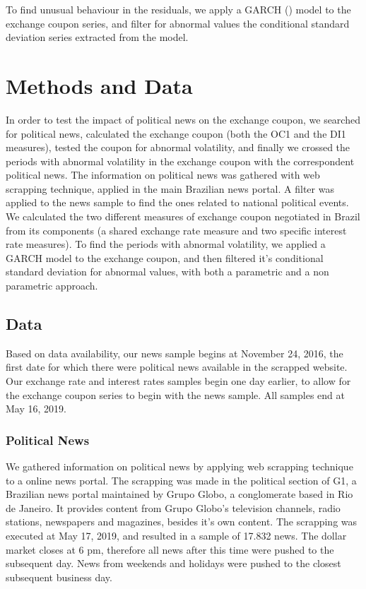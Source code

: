 \documentclass[cic,tc, english]{iiufrgs}
\begin{document}
    To find unusual behaviour in the residuals, we apply a GARCH (\citet{bollerslev1986}) model to the exchange coupon series, and filter for abnormal values the conditional standard deviation series extracted from the model.
    

\chapter{Methods and Data} \label{chapter_methods_data}

    In order to test the impact of political news on the exchange coupon, we searched for political news, calculated the exchange coupon (both the OC1 and the DI1 measures), tested the coupon for abnormal volatility, and finally we crossed the periods with abnormal volatility in the exchange coupon with the correspondent political news. The information on political news was gathered with web scrapping technique, applied in the main Brazilian news portal. A filter was applied to the news sample to find the ones related to national political events. We calculated the two different measures of exchange coupon negotiated in Brazil from its components (a shared exchange rate measure and two specific interest rate measures). To find the periods with abnormal volatility, we applied a GARCH model to the exchange coupon, and then filtered it's conditional standard deviation for abnormal values, with both a parametric and a non parametric approach.

\section{Data} \label{chapter_data}

    Based on data availability, our news sample begins at November 24, 2016, the first date for which there were political news available in the scrapped website. Our exchange rate and interest rates samples begin one day earlier, to allow for the exchange coupon series to begin with the news sample. All samples end at May 16, 2019.

\subsection{Political News} \label{chapter_political_news}
    
    We gathered information on political news by applying web scrapping technique to a online news portal. The scrapping was made in the political section of G1, a Brazilian news portal maintained by Grupo Globo, a conglomerate based in Rio de Janeiro. It provides content from Grupo Globo's television channels, radio stations, newspapers and magazines, besides it's own content. The scrapping was executed at May 17, 2019, and resulted in a sample of 17.832 news. The dollar market closes at 6 pm, therefore all news after this time were pushed to the subsequent day. News from weekends and holidays were pushed to the closest subsequent business day.
\end{document}

